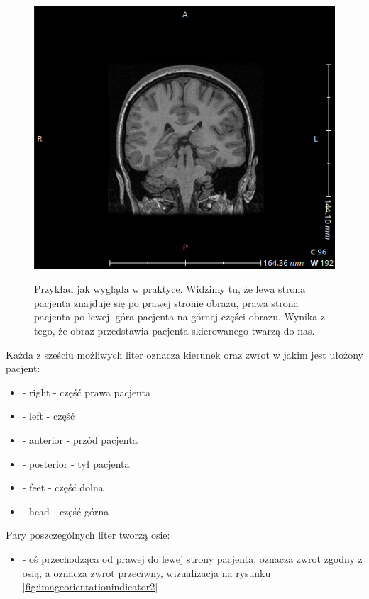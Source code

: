 \begin{itemize}
    \begin{figure}[!htbp]
        \caption{
            Przykład jak wygląda  w praktyce.
            Widzimy tu, że lewa strona pacjenta znajduje się po prawej stronie obrazu, prawa strona pacjenta po lewej, góra pacjenta na górnej części obrazu.
            Wynika z tego, że obraz przedstawia pacjenta skierowanego twarzą do nas.
            }
        \includegraphics[width=\textwidth]{img/imageorientationindicator-002.png}
        \centering
        \label{fig:imageorientationindicator1}
    \end{figure}
    
    Każda z sześciu możliwych liter oznacza kierunek oraz zwrot w jakim jest ułożony pacjent:
    \begin{itemize}
        \item {} - right - część prawa pacjenta
        \item {} - left - część 
        \item {} - anterior - przód pacjenta
        \item {} - posterior - tył pacjenta
        \item {} - feet - część dolna
        \item {} - head - część górna
    \end{itemize}

    Pary poszczególnych liter tworzą osie:
    \begin{itemize}
        \item {} - oś przechodząca od prawej do lewej strony pacjenta,  oznacza zwrot zgodny z osią, a  oznacza zwrot przeciwny, wizualizacja na rysunku \ref{fig:imageorientationindicator2}


\end{itemize}
\end{itemize}
